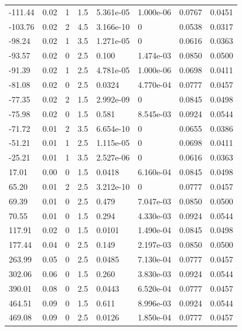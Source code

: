 \documentclass[preview]{standalone}
\begin{document}
{{\begin{tabular}{L{1.2cm}C{1.2cm} C{0.3cm}C{0.5cm} C{1.4cm}C{1.4cm} C{1.4cm}C{1.4cm}}
  -111.44  &  0.02  & 1     & 1.5 &  5.361e-05  & 1.000e-06  & 0.0767 &  0.0451   \\ 
  -103.76  &  0.02  & 2     & 4.5 &  3.166e-10  & 0  & 0.0538 &  0.0317   \\ 
  -98.24  &  0.02  & 1     & 3.5 &  1.271e-05  & 0  & 0.0616 &  0.0363   \\ 
  -93.57  &  0.02  & 0     & 2.5 &  0.100  & 1.474e-03  & 0.0850 &  0.0500   \\ 
  -91.39  &  0.02  & 1     & 2.5 &  4.781e-05  & 1.000e-06  & 0.0698 &  0.0411   \\ 
  -81.08  &  0.02  & 0     & 2.5 &  0.0324  & 4.770e-04  & 0.0777 &  0.0457   \\ 
  -77.35  &  0.02  & 2     & 1.5 &  2.992e-09  & 0  & 0.0845 &  0.0498   \\ 
  -75.98  &  0.02  & 0     & 1.5 &  0.581  & 8.545e-03  & 0.0924 &  0.0544   \\ 
  -71.72  &  0.01  & 2     & 3.5 &  6.654e-10  & 0  & 0.0655 &  0.0386   \\ 
  -51.21  &  0.01  & 1     & 2.5 &  1.115e-05  & 0  & 0.0698 &  0.0411   \\ 
  -25.21  &  0.01  & 1     & 3.5 &  2.527e-06  & 0  & 0.0616 &  0.0363   \\ 
  17.01  &  0.00  & 0     & 1.5 &  0.0418  & 6.160e-04  & 0.0845 &  0.0498   \\ 
  65.20  &  0.01  & 2     & 2.5 &  3.212e-10  & 0  & 0.0777 &  0.0457   \\ 
  69.39  &  0.01  & 0     & 2.5 &  0.479  & 7.047e-03  & 0.0850 &  0.0500   \\ 
  70.55  &  0.01  & 0     & 1.5 &  0.294  & 4.330e-03  & 0.0924 &  0.0544   \\ 
  117.91  &  0.02  & 0     & 1.5 &  0.0101  & 1.490e-04  & 0.0845 &  0.0498   \\ 
  177.44  &  0.04  & 0     & 2.5 &  0.149  & 2.197e-03  & 0.0850 &  0.0500   \\ 
  263.99  &  0.05  & 0     & 2.5 &  0.0485  & 7.130e-04  & 0.0777 &  0.0457   \\ 
  302.06  &  0.06  & 0     & 1.5 &  0.260  & 3.830e-03  & 0.0924 &  0.0544   \\ 
  390.01  &  0.08  & 0     & 2.5 &  0.0443  & 6.520e-04  & 0.0777 &  0.0457   \\ 
  464.51  &  0.09  & 0     & 1.5 &  0.611  & 8.996e-03  & 0.0924 &  0.0544   \\ 
  469.08  &  0.09  & 0     & 2.5 &  0.0126  & 1.850e-04  & 0.0777 &  0.0457   \\ 

\end{tabular}}}
\end{document}
